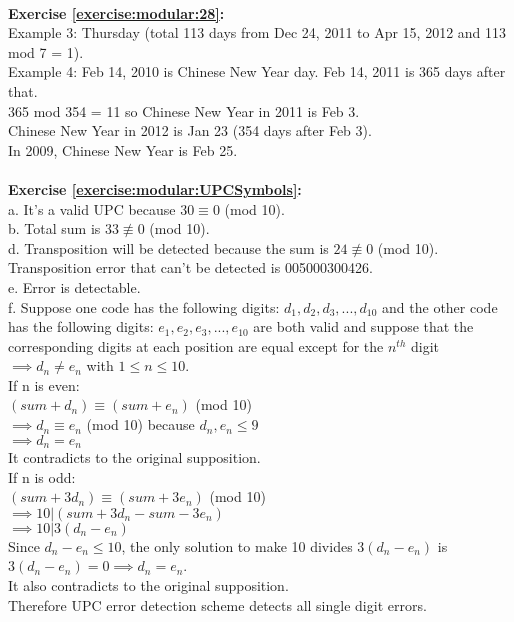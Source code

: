 \\
\textbf{Exercise \ref{exercise:modular:28}:}\\
Example 3: Thursday (total 113 days from Dec 24, 2011 to Apr 15, 2012 and 113 mod 7 = 1).\\
Example 4: Feb 14, 2010 is Chinese New Year day. Feb 14, 2011 is 365 days after that.\\
365 mod 354 = 11 so Chinese New Year in 2011 is Feb 3.\\
Chinese New Year in 2012 is Jan 23 (354 days after Feb 3).\\
In 2009, Chinese New Year is Feb 25.\\
\\
\textbf{Exercise \ref{exercise:modular:UPCSymbols}:}\\
a. It's a valid UPC because $30 \equiv 0$ (mod 10).\\
b. Total sum is $33 \not\equiv 0$ (mod 10).\\
d. Transposition will be detected because the sum is $24 \not\equiv 0$ (mod 10).\\
Transposition error that can't be detected is 005000300426.\\
e. Error is detectable.\\
f. Suppose one code has the following digits: $d_1,d_2,d_3,...,d_{10}$ and the other code has the following digits: $e_1,e_2,e_3,...,e_{10}$ are both valid and suppose that the corresponding digits at each position are equal except for the $n^{th}$ digit $\implies d_n \neq e_n$ with $1 \le n \le 10$.\\
If n is even:\\
$(sum + d_n) \equiv (sum + e_n)$ (mod 10)\\
$\implies d_n \equiv e_n$ (mod 10) because $d_n, e_n \le 9$\\
$\implies d_n = e_n$\\
It contradicts to the original supposition.\\
If n is odd:\\
$(sum+3d_n) \equiv (sum+3e_n)$ (mod 10)\\
$\implies 10|(sum+3d_n-sum-3e_n)$\\
$\implies 10|3(d_n-e_n)$\\
Since $d_n-e_n \le 10$, the only solution to make 10 divides $3(d_n-e_n)$ is $3(d_n-e_n)=0 \implies d_n=e_n$.\\
It also contradicts to the original supposition.\\
Therefore UPC error detection scheme detects all single digit errors.\\
